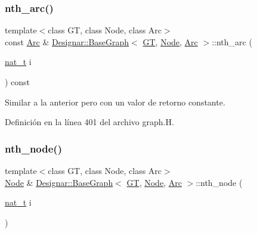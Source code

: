 \subsubsection{\texorpdfstring{nth\+\_\+arc()}{nth\_arc()}\hspace{0.1cm}{\footnotesize\ttfamily [2/2]}}
{\footnotesize\ttfamily template$<$class GT, class Node, class Arc$>$ \\
const \hyperlink{namespace_designar_a3f55fb5513d62ff47cbc8f72b8e95d6f}{Arc} \& \hyperlink{class_designar_1_1_base_graph}{Designar\+::\+Base\+Graph}$<$ \hyperlink{demo-buildgraph_8_c_a3001c40d2c31ca87ed96cd7d1334a55e}{GT}, \hyperlink{namespace_designar_a5af326c65aa2bd26b26c410f2030d09e}{Node}, \hyperlink{namespace_designar_a3f55fb5513d62ff47cbc8f72b8e95d6f}{Arc} $>$\+::nth\+\_\+arc (\begin{DoxyParamCaption}\item[{\hyperlink{namespace_designar_aa72662848b9f4815e7bf31a7cf3e33d1}{nat\+\_\+t}}]{i }\end{DoxyParamCaption}) const\hspace{0.3cm}{\ttfamily [inline]}}



Similar a la anterior pero con un valor de retorno constante. 



Definición en la línea 401 del archivo graph.\+H.

\mbox{\label{class_designar_1_1_base_graph_ae4b7d560477f0b860d127a6ace6956e5}} 
\subsubsection{\texorpdfstring{nth\+\_\+node()}{nth\_node()}\hspace{0.1cm}{\footnotesize\ttfamily [1/2]}}
{\footnotesize\ttfamily template$<$class GT, class Node, class Arc$>$ \\
\hyperlink{namespace_designar_a5af326c65aa2bd26b26c410f2030d09e}{Node} \& \hyperlink{class_designar_1_1_base_graph}{Designar\+::\+Base\+Graph}$<$ \hyperlink{demo-buildgraph_8_c_a3001c40d2c31ca87ed96cd7d1334a55e}{GT}, \hyperlink{namespace_designar_a5af326c65aa2bd26b26c410f2030d09e}{Node}, \hyperlink{namespace_designar_a3f55fb5513d62ff47cbc8f72b8e95d6f}{Arc} $>$\+::nth\+\_\+node (\begin{DoxyParamCaption}\item[{\hyperlink{namespace_designar_aa72662848b9f4815e7bf31a7cf3e33d1}{nat\+\_\+t}}]{i }\end{DoxyParamCaption})\hspace{0.3cm}{\ttfamily [inline]}}



